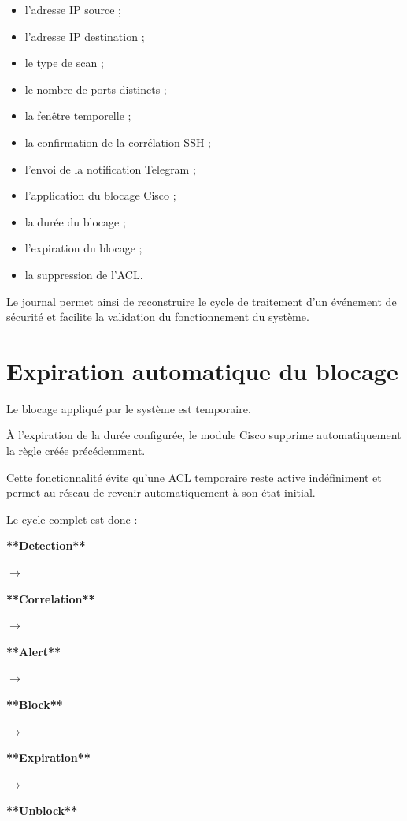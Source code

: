 \begin{itemize}

\item l'adresse IP source ;

\item l'adresse IP destination ;

\item le type de scan ;

\item le nombre de ports distincts ;

\item la fenêtre temporelle ;

\item la confirmation de la corrélation SSH ;

\item l'envoi de la notification Telegram ;

\item l'application du blocage Cisco ;

\item la durée du blocage ;

\item l'expiration du blocage ;

\item la suppression de l'ACL.

\end{itemize}

Le journal permet ainsi de reconstruire le cycle de traitement d'un événement de sécurité et facilite la validation du fonctionnement du système.

\section{Expiration automatique du blocage}

Le blocage appliqué par le système est temporaire.

À l'expiration de la durée configurée, le module Cisco supprime automatiquement la règle créée précédemment.

Cette fonctionnalité évite qu'une ACL temporaire reste active indéfiniment et permet au réseau de revenir automatiquement à son état initial.

Le cycle complet est donc :

\begin{center}

\textbf{**Detection**}

$\rightarrow$

\textbf{**Correlation**}

$\rightarrow$

\textbf{**Alert**}

$\rightarrow$

\textbf{**Block**}

$\rightarrow$

\textbf{**Expiration**}

$\rightarrow$

\textbf{**Unblock**}

\end{center}

